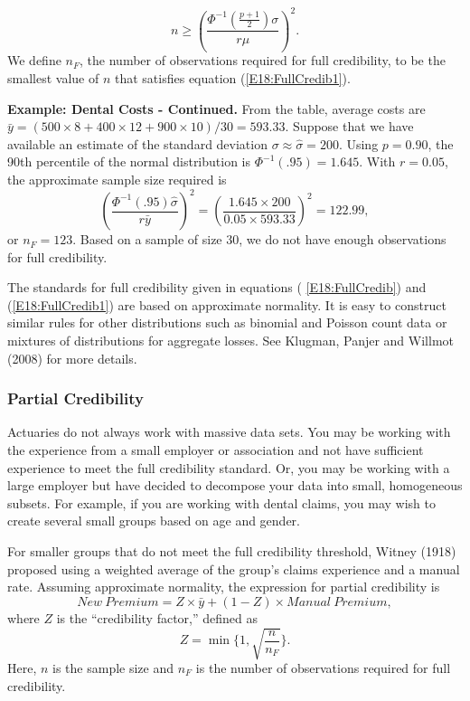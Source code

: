 \begin{equation}\label{E18:FullCredib1}
n \geq \left(\frac{\Phi^{-1}(\frac{p+1}{2}) \sigma}{r \mu} \right)^2
.
\end{equation}
We define $n_F$, the number of observations required for full
credibility, to be the smallest value of $n$ that satisfies equation
(\ref{E18:FullCredib1}).

\linejed

\textbf{Example: Dental Costs - Continued.} From the table, average
costs are $\bar{y} = \left( 500 \times 8 + 400 \times 12 + 900
\times 10 \right)/30 = 593.33.$ Suppose that we have available an
estimate of the standard deviation $\sigma \approx \widehat{\sigma}=
200.$ Using $p=0.90$, the 90th percentile of the normal distribution
is $\Phi^{-1}(.95) = 1.645$. With $r=0.05$, the approximate sample
size required is
\begin{equation*}
 \left(\frac{\Phi^{-1}(.95) \widehat{\sigma}}{r \bar{y}} \right)^2 =
  \left(\frac{1.645 \times 200}{0.05 \times 593.33} \right)^2=
  122.99,
\end{equation*}
or $n_F=123$. Based on a sample of size 30, we do not have enough
observations for full credibility.

\linejed

\bigskip

The standards for full credibility given in equations (
\ref{E18:FullCredib}) and (\ref{E18:FullCredib1}) are based on
approximate normality. It is easy to construct similar rules for
other distributions such as binomial and Poisson count data or
mixtures of distributions for aggregate losses. See Klugman, Panjer
and Willmot (2008) for more details.

\subsubsection*{Partial Credibility}

Actuaries do not always work with massive data sets. You may be
working with the experience from a small employer or association and
not have sufficient experience to meet the full credibility
standard. Or, you may be working with a large employer but have
decided to decompose your data into small, homogeneous subsets. For
example, if you are working with dental claims, you may wish to
create several small groups based on age and gender.

For smaller groups that do not meet the full credibility threshold,
Witney (1918) proposed using a weighted average of the group's
claims experience and a manual rate. Assuming approximate normality,
the expression for partial credibility is
\begin{equation}\label{E18:ParCred}
New~Premium =  Z \times \bar{y} + (1 - Z)  \times Manual~Premium,
\end{equation}
where $Z$ is the ``credibility factor,'' defined as
\begin{equation}\label{E18:ParCredFactor}
Z = \min\{1,\sqrt{\frac{n}{n_F}} \}.
\end{equation}
Here, $n$ is the sample size and $n_F$ is the number of observations
required for full credibility.

